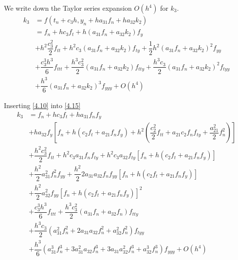 \documentclass[a4paper,oneside]{book}
\numberwithin{equation}{chapter}
\begin{document}
We write down the Taylor series expansion $O\left(h^4\right)$ for $k_3$.
\begin{align}
{k_3} &= f\left( {{t_n} + {c_3}h,{y_n} + h{a_{31}}{f_n} + h{a_{32}}{k_2}} \right)\\
 &= {f_n} + h{c_3}{f_t} + h\left( {{a_{31}}{f_n} + {a_{32}}{k_2}} \right){f_y}\\
 &+ {h^2}\dfrac{{c_3^2}}{2}{f_{tt}} + {h^2}{c_3}\left( {{a_{31}}{f_n} + {a_{32}}{k_2}} \right){f_{ty}} + \dfrac{1}{2}{h^2}{\left( {{a_{31}}{f_n} + {a_{32}}{k_2}} \right)^2}{f_{yy}}\\
 &+ \dfrac{{c_3^3{h^3}}}{6}{f_{ttt}} + \dfrac{{{h^3}c_3^2}}{2}\left( {{a_{31}}{f_n} + {a_{32}}{k_2}} \right){f_{tty}} + \dfrac{{{h^3}{c_3}}}{2}{\left( {{a_{31}}{f_n} + {a_{32}}{k_2}} \right)^2}{f_{tyy}}\\
 &+ \dfrac{{{h^3}}}{6}{\left( {{a_{31}}{f_n} + {a_{32}}{k_2}} \right)^3}{f_{yyy}} + O\left( {{h^4}} \right)
 \label{4.15}
\end{align}

Inserting \eqref{4.10} into \eqref{4.15}
\begin{align}
{k_3} &= {f_n} + h{c_3}{f_t} + h{a_{31}}{f_n}{f_y}\\
 &+ h{a_{32}}{f_y}\left[ {{f_n} + h\left( {{c_2}{f_t} + {a_{21}}{f_n}{f_y}} \right) + {h^2}\left( {\dfrac{{c_2^2}}{2}{f_{tt}} + {a_{21}}{c_2}{f_n}{f_{ty}} + \dfrac{{a_{21}^2}}{2}f_n^2} \right)} \right]\\
 &+ \dfrac{{{h^2}c_3^2}}{2}{f_{tt}} + {h^2}{c_3}{a_{31}}{f_n}{f_{ty}} + {h^2}{c_3}{a_{32}}{f_{ty}}\left[ {{f_n} + h\left( {{c_2}{f_t} + {a_{21}}{f_n}{f_y}} \right)} \right]\\
 &+ \dfrac{{{h^2}}}{2}a_{31}^2f_n^2{f_{yy}} + \dfrac{{{h^2}}}{2}2{a_{31}}{a_{32}}{f_n}{f_{yy}}\left[ {{f_n} + h\left( {{c_2}{f_t} + {a_{21}}{f_n}{f_y}} \right)} \right]\\
 &+ \dfrac{{{h^2}}}{2}a_{32}^2{f_{yy}}{\left[ {{f_n} + h\left( {{c_2}{f_t} + {a_{21}}{f_n}{f_y}} \right)} \right]^2}\\
 &+ \dfrac{{c_3^3{h^3}}}{6}{f_{ttt}} + \dfrac{{{h^3}c_3^2}}{2}\left( {{a_{31}}{f_n} + {a_{32}}{f_n}} \right){f_{tty}}\\
 &+ \dfrac{{{h^3}{c_3}}}{2}\left( {a_{31}^2f_n^2 + 2{a_{31}}{a_{32}}f_n^2 + a_{32}^2f_n^2} \right){f_{tyy}}\\
 &+ \dfrac{{{h^3}}}{6}\left( {a_{31}^3f_n^3 + 3a_{31}^2{a_{32}}f_n^3 + 3{a_{31}}a_{32}^2f_n^3 + a_{32}^3f_n^3} \right){f_{yyy}} + O\left( {{h^4}} \right)
\end{align}
\end{document}
